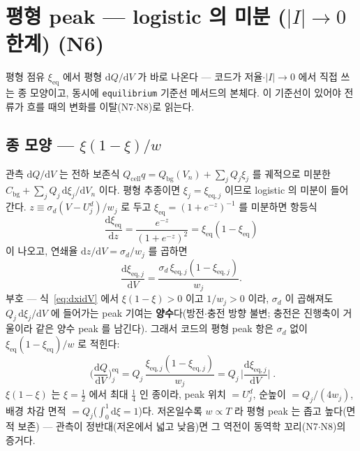 \documentclass[11pt,a4paper]{article}
\newcommand{\dd}{\mathrm{d}}
\newcommand{\eq}{\mathrm{eq}}
\newcommand{\cell}{\mathrm{cell}}
\newcommand{\bg}{\mathrm{bg}}
\newcommand{\sgn}{\sigma_d}
\begin{document}
\section{평형 peak — logistic 의 미분 ($|I|\to0$ 한계) (N6)}\label{sec:eqpeak}
평형 점유 $\xi_\eq$ 에서 평형 $\dd Q/\dd V$ 가 바로 나온다 — 코드가 저율$\cdot|I|\to0$ 에서 직접 쓰는 종 모양이고, 동시에 \texttt{equilibrium} 기준선 메서드의 본체다. 이 기준선이 있어야 전류가 흐를 때의 변화를 이탈(N7$\cdot$N8)로 읽는다.

\subsection{종 모양 — $\xi(1-\xi)/w$}
관측 $\dd Q/\dd V$ 는 전하 보존식 $Q_\cell q=Q_\bg(V_n)+\sum_jQ_j\xi_j$ 를 궤적으로 미분한 $C_\bg+\sum_jQ_j\,\dd\xi_j/\dd V_n$ 이다. 평형 추종이면 $\xi_j=\xi_{\eq,j}$ 이므로 logistic 의 미분이 들어간다. $z\equiv\sgn(V-U_j^d)/w_j$ 로 두고 $\xi_\eq=(1+e^{-z})^{-1}$ 를 미분하면 항등식
\begin{equation}
\frac{\dd\xi_\eq}{\dd z}=\frac{e^{-z}}{(1+e^{-z})^2}=\xi_\eq(1-\xi_\eq)
\label{eq:belliden}
\end{equation}
이 나오고, 연쇄율 $\dd z/\dd V=\sgn/w_j$ 를 곱하면
\begin{equation}
\frac{\dd\xi_{\eq,j}}{\dd V}=\frac{\sgn\,\xi_{\eq,j}(1-\xi_{\eq,j})}{w_j}.
\label{eq:dxidV}
\end{equation}
부호 — 식~\eqref{eq:dxidV} 에서 $\xi(1-\xi)>0$ 이고 $1/w_j>0$ 이라, $\sgn$ 이 곱해져도 $Q_j\,\dd\xi_j/\dd V$ 에 들어가는 peak 기여는 \textbf{양수}다(방전$\cdot$충전 방향 불변; 충전은 진행축이 거울이라 같은 양수 peak 를 남긴다). 그래서 코드의 평형 peak 항은 $\sgn$ 없이 $\xi_\eq(1-\xi_\eq)/w$ 로 적힌다:
\begin{equation}
\boxed{\;\Big(\frac{\dd Q}{\dd V}\Big)^{\eq}_j=Q_j\,\frac{\xi_{\eq,j}(1-\xi_{\eq,j})}{w_j}
=Q_j\,\Big|\frac{\dd\xi_{\eq,j}}{\dd V}\Big|\;.}
\label{eq:eqpeak}
\end{equation}
$\xi(1-\xi)$ 는 $\xi=\tfrac12$ 에서 최대 $\tfrac14$ 인 종이라, peak 위치 $=U_j^d$, 순높이 $=Q_j/(4w_j)$, 배경 차감 면적 $=Q_j$($\int_0^1\dd\xi=1$)다. 저온일수록 $w\propto T$ 라 평형 peak 는 좁고 높다(면적 보존) — 관측이 정반대(저온에서 넓고 낮음)면 그 역전이 동역학 꼬리(N7$\cdot$N8)의 증거다.
\end{document}
